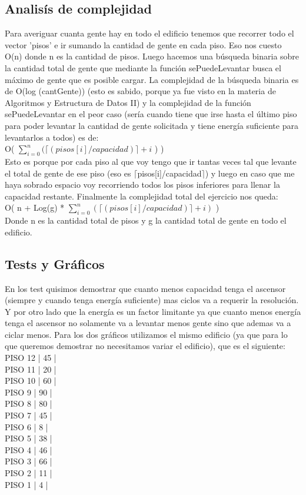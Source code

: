 \subsection{Analisís de complejidad}	
Para averiguar cuanta gente hay en todo el edificio tenemos que recorrer todo el vector 'pisos' e ir sumando la cantidad de gente en cada piso. Eso nos cuesto O(n) donde n es la cantidad de pisos. Luego hacemos una búsqueda binaria sobre la cantidad total de gente que mediante la función sePuedeLevantar busca el máximo de gente que es posible cargar. La complejidad de la búsqueda binaria es de O(log (cantGente)) (esto es sabido, porque ya fue visto en la materia de Algoritmos y Estructura de Datos II) y la complejidad de la función sePuedeLevantar en el peor caso (sería cuando tiene que irse hasta el último piso para poder levantar la cantidad de gente solicitada y tiene energía suficiente para levantarlos a todos) es de: \\
	O( $\sum\limits_{i=0}^{n} { ( \lceil (pisos[i]/capacidad) \rceil  + i}$ ) ) \\
Esto es porque por cada piso al que voy tengo que ir tantas veces tal que levante el total de gente de ese piso (eso es $\lceil$pisos[i]/capacidad$\rceil$) y luego en caso que me haya sobrado espacio voy recorriendo todos los pisos inferiores para llenar la capacidad restante.
Finalmente la complejidad total del ejercicio nos queda:\\
O( n + Log(g) * $\sum\limits_{i=0}^{n} { ( \lceil (pisos[i]/capacidad) \rceil  + i ) }$ ) \\
Donde n es la cantidad total de pisos y g la cantidad total de gente en todo el edificio.

\subsection{Tests y Gráficos}
En los test quisimos demostrar que cuanto menos capacidad tenga el ascensor (siempre y cuando tenga energía suficiente) mas ciclos va a requerir la resolución. Y por otro lado que la energía es un factor limitante ya que cuanto menos energía tenga el ascensor no solamente va a levantar menos gente sino que ademas va a ciclar menos.
Para los dos gráficos utilizamos el mismo edificio (ya que para lo que queremos demostrar no necesitamos variar el edificio), que es el siguiente: \\

PISO 12 | 45 | \\
PISO 11 | 20 | \\
PISO 10 | 60 | \\
PISO 9  | 90 | \\
PISO 8  | 80 | \\
PISO 7  | 45 | \\
PISO 6  | 8  | \\
PISO 5  | 38 | \\
PISO 4  | 46 | \\
PISO 3  | 66 | \\
PISO 2  | 11 | \\
PISO 1  | 4  | \\

